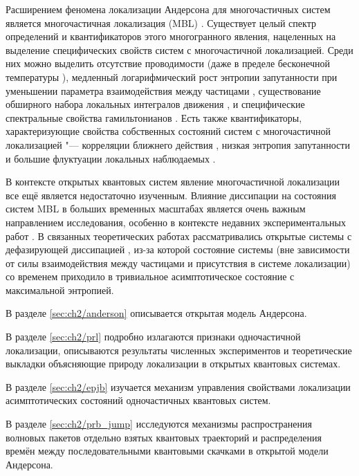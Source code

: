 Расширением феномена локализации Андерсона для многочастичных систем является многочастичная локализация (MBL) \cite{Basko2006, Gornyi2005}.
Существует целый спектр определений и квантификаторов этого многогранного явления, нацеленных на выделение специфических свойств систем с многочастичной локализацией.
Среди них можно выделить отсутствие проводимости \autocite{Gornyi2005} (даже в пределе бесконечной температуры \autocite{Basko2006}), медленный логарифмический рост энтропии запутанности при уменьшении параметра взаимодействия между частицами \autocite{Chiara2006, Znidaric2008, Bardarson2012, Serbyn2013_1}, существование обширного набора локальных интегралов движения \autocite{Serbyn2013_2}, и специфические спектральные свойства гамильтонианов \autocite{Oganesyan2007, Serbyn2016}.
Есть также квантификаторы, характеризующие свойства собственных состояний систем с многочастичной локализацией "--- корреляции ближнего действия \autocite{Pal2010}, низкая энтропия запутанности \autocite{Bauer2013, Kjll2014, Khemani2017} и большие флуктуации локальных наблюдаемых \autocite{Bera2015}.

В контексте открытых квантовых систем явление многочастичной локализации все ещё является недостаточно изученным. Влияние диссипации на состояния систем  MBL в больших временных масштабах является очень важным направлением исследования, особенно в контексте недавних экспериментальных работ \autocite{Schreiber2015, Choi2016, Bordia2017, Smith2016}. В связанных теоретических работах \autocite{Levi2016, Fischer2016, Medvedyeva2016} рассматривались открытые системы с дефазирующей диссипацией \autocite{Poletti2013}, из-за которой состояние системы (вне зависимости от силы взаимодействия между частицами и присутствия в системе локализации) со временем приходило в тривиальное асимптотическое состояние с максимальной энтропией.

В разделе \cref{sec:ch2/anderson} описывается открытая модель Андерсона.

В разделе \cref{sec:ch2/prl} подробно излагаются признаки одночастичной локализации, описываются результаты численных экспериментов и теоретические выкладки объясняющие природу локализации в открытых квантовых системах. 

В разделе \cref{sec:ch2/epjb} изучается механизм управления свойствами локализации асимптотических состояний одночастичных квантовых систем. 

В разделе \cref{sec:ch2/prb_jump} исследуются механизмы распространения волновых пакетов отдельно взятых квантовых траекторий и распределения времён между последовательными квантовыми скачками в открытой модели Андерсона.

